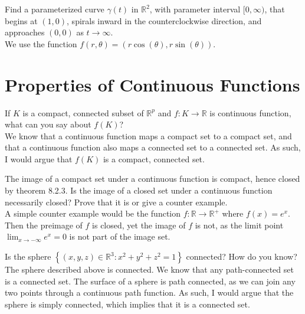 \documentclass[12pt]{book}
\newcommand{\R}{\mathbb{R}}
\newenvironment{exercise}[2][Exercise]{\begin{trivlist}
\item[\hskip \labelsep {\bfseries #1}\hskip \labelsep {\bfseries #2.}]}{\end{trivlist}}
\begin{document}
\begin{exercise}{8.1.14}
Find a parameterized curve $\gamma(t)$ in $\R^2$, with parameter interval $[0, \infty)$, that begins at $(1,0)$, spirals inward in the counterclockwise direction, and approaches $(0,0)$ as $t \to \infty$. \\

We use the function $f(r,\theta) = \left( r \cos(\theta), r \sin(\theta) \right)$.
\end{exercise}




\section{Properties of Continuous Functions}


\begin{exercise}{8.2.3}
If $K$ is a compact, connected subset of $\R^p$ and $f:K \to \R$ is continuous function, what can you say about $f(K)$? \\

We know that a continuous function maps a compact set to a compact set, and that a continuous function also maps a connected set to a connected set. As such, I would argue that $f(K)$ is a compact, connected set.
\end{exercise}



\begin{exercise}{8.2.5}
The image of a compact set under a continuous function is compact, hence closed by theorem 8.2.3. Is the image of a closed set under a continuous function necessarily closed? Prove that it is or give a counter example.  \\

A simple counter example would be the function $f:\R \to \R^+$ where $f(x) = e^x$. Then the preimage of $f$ is closed, yet the image of $f$ is not, as the limit point $\lim_{x \to -\infty} e^x = 0$ is not part of the image set. 
\end{exercise}



\begin{exercise}{8.2.7}
Is the sphere $\left\{ (x,y,z) \in \R^3 : x^2 + y^2 + z^2 =1 \right\}$ connected? How do you know? \\

The sphere described above is connected. We know that any path-connected set is a connected set. The surface of a sphere is path connected, as we can join any two points through a continuous path function. As such, I would argue that the sphere is simply connected, which implies that it is a connected set.
\end{exercise}
\end{document}
